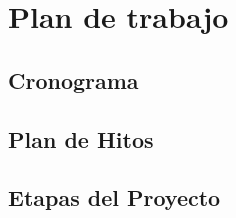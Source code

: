 \section{Plan de trabajo}
  \subsection{Cronograma}
    
  \subsection{Plan de Hitos}
    
  \subsection{Etapas del Proyecto}
    
\clearpage
